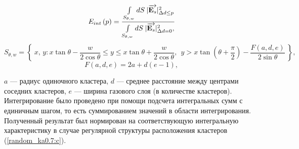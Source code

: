     \begin{equation}
        E_{int} \left(p \right) = \cfrac{\int \limits_{S_{\theta, w}} dS\:|\overrightarrow{\textbf{E}_{s}}|^2_{\Delta d \leq p}}{\int \limits_{S_{\theta, w}} dS\:|\overrightarrow{\textbf{E}_{s}}|^2_{\Delta d = 0}, }
        \label{integrate_sc_E}
    \end{equation}
    \begin{equation}
        S_{\theta, w} = \left\{\:x,\,y : x\tan{\theta} - \frac{w}{2\cos{\theta}} \leq y \leq x\tan{\theta} + \frac{w}{2\cos{\theta}},\:\: y > x\tan(\theta + \frac{\pi}{2}) - \frac{F\left(a, d, e\right)}{2\sin{\theta}}\:\right\},
        \label{integrate_sc_E_sub}
    \end{equation}
    \begin{equation*}
        F\left(a, d, e\right) = 2a + d(e - 1),
    \end{equation*}

 $a$ --- радиус одиночного кластера, $d$ --- среднее расстояние между центрами соседних кластеров, $e$ --- ширина газового слоя (в количестве кластеров). Интегрирование было проведено при помощи подсчета интегральных сумм с единичным шагом, то есть суммированием значений в области интегрирования. Полученный результат был нормирован на соответствующую интегральную характеристику в случае регулярной структуры расположения кластеров (\autoref{random_ka0.7:c}).

